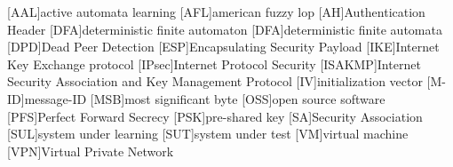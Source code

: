 \begin{acronym}
	[AAL]{active automata learning}
	[AFL]{american fuzzy lop}
	[AH]{Authentication Header}
	[DFA]{deterministic finite automaton}
	[DFA]{deterministic finite automata}
	[DPD]{Dead Peer Detection}
	[ESP]{Encapsulating Security Payload}
	[IKE]{Internet Key Exchange protocol}
	[IPsec]{Internet Protocol Security}
	[ISAKMP]{Internet Security Association and Key Management Protocol}
	[IV]{initialization vector}
	[M-ID]{message-ID}
	[MSB]{most significant byte}
	[OSS]{open source software}
	[PFS]{Perfect Forward Secrecy}
	[PSK]{pre-shared key}
	[SA]{Security Association}
	[SUL]{system under learning}
	[SUT]{system under test}
	[VM]{virtual machine}
	[VPN]{Virtual Private Network}
\end{acronym}
\newpage
